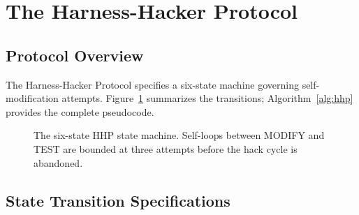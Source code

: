 \documentclass[11pt]{article}
\begin{document}
\section{The Harness-Hacker Protocol}
\label{sec:protocol}

\subsection{Protocol Overview}
\label{sec:protocol-overview}

The Harness-Hacker Protocol specifies a six-state machine governing
self-modification attempts. Figure~\ref{fig:state-machine} summarizes the
transitions; Algorithm~\ref{alg:hhp} provides the complete pseudocode.

\begin{figure}[H]
\centering
\setlength{\fboxsep}{8pt}
\caption{The six-state HHP state machine. Self-loops between MODIFY and TEST
are bounded at three attempts before the hack cycle is abandoned.}
\label{fig:state-machine}
\end{figure}

\subsection{State Transition Specifications}
\label{sec:transitions}
\end{document}
